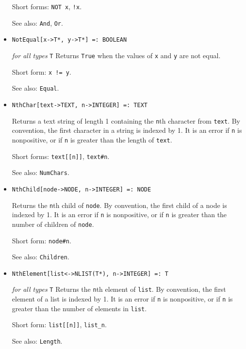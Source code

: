 \begin{itemize}
\item [Short forms:] \verb+NOT x+, \verb+!x+.
\item [See also:] \verb+And+, \verb+Or+.
\ed

\item{}
\protect \large \begin{verbatim}
NotEqual[x->T*, y->T*] =: BOOLEAN
\end{verbatim}\normalsize

{\it for all types} {\tt T}
\bd
Returns \verb+True+ when the values of \verb+x+ and \verb+y+ are
not equal.
\item [Short form:] \verb+x != y+.
\item [See also:] \verb+Equal+.
\ed

\item{}
\protect \large \begin{verbatim}
NthChar[text->TEXT, n->INTEGER] =: TEXT 
\end{verbatim}\normalsize

\bd
Returns a text string of length 1 containing the \verb+n+th
character from \verb+text+.  By convention, the first character
in a string is indexed by 1.  It is an error if \verb+n+ is nonpositive,
or if \verb+n+ is greater than the length of \verb+text+.
\item [Short forms:] \verb+text[[n]]+, \verb+text#n+.
\item [See also:] \verb+NumChars+.
\ed

\item{}
\protect \large \begin{verbatim} 
NthChild[node->NODE, n->INTEGER] =: NODE 
\end{verbatim}\normalsize

\bd
Returns the \verb+n+th child of \verb+node+.
By convention, the first child of a node is indexed by 1.
It is an error if \verb+n+ is nonpositive, or if \verb+n+ is greater
than the number of children of \verb+node+.
\item [Short form:] \verb+node#n+.
\item [See also:] \verb+Children+.
\ed

\item{}
\protect \large \begin{verbatim}
NthElement[list<->NLIST(T*), n->INTEGER] =: T 
\end{verbatim}\normalsize

{\it for all types} {\tt T}
\bd
Returns the \verb+n+th element of \verb+list+.
By convention, the first element of a list is indexed by 1.
It is an error if \verb+n+ is nonpositive, or if \verb+n+ is greater
than the number of elements in \verb+list+.
\item [Short form:] \verb+list[[n]]+, \verb+list_n+.
\item [See also:] \verb+Length+.
\ed


\end{itemize}
